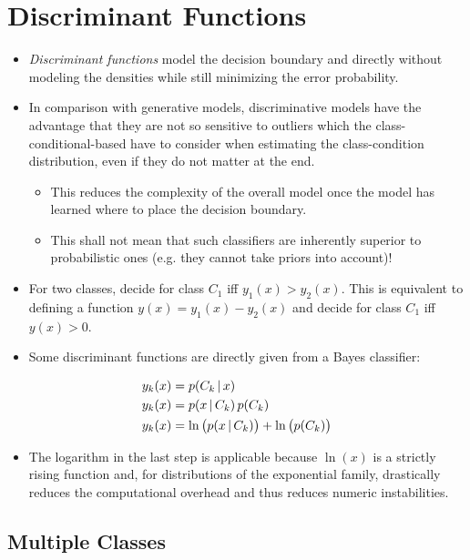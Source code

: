 \section{Discriminant Functions}
	\begin{itemize}
		\item \emph{Discriminant functions} model the decision boundary and directly without modeling the densities while still minimizing the error probability.
		\item In comparison with generative models, discriminative models have the advantage that they are not so sensitive to outliers which the class-conditional-based have to consider when estimating the class-condition distribution, even if they do not matter at the end.
			\begin{itemize}
				\item This reduces the complexity of the overall model once the model has learned where to place the decision boundary.
				\item This shall not mean that such classifiers are inherently superior to probabilistic ones (e.g. they cannot take priors into account)!
			\end{itemize}
		\item For two classes, decide for class \(C_1\) iff \( y_1(x) > y_2(x) \). This is equivalent to defining a function \( y(x) = y_1(x) - y_2(x) \) and decide for class \(C_1\) iff \( y(x) > 0 \).
		\item Some discriminant functions are directly given from a Bayes classifier:
	\end{itemize}
	\begin{align}
		y_k(x) & = p(C_k \,\vert\, x)                                    \\
		y_k(x) & = p(x \,\vert\, C_k) \, p(C_k)                          \\
		y_k(x) & = \ln\big(p(x \,\vert\, C_k)\big) + \ln\big(p(C_k)\big)
	\end{align}
	\begin{itemize}
		\item[] The logarithm in the last step is applicable because \(\ln(x)\) is a strictly rising function and, for distributions of the exponential family, drastically reduces the computational overhead and thus reduces numeric instabilities.
	\end{itemize}

	\subsection{Multiple Classes}
		\label{sec:classificationMultiple}

